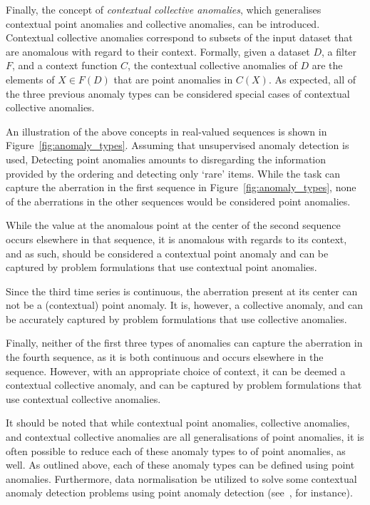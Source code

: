 Finally, the concept of \emph{contextual collective anomalies}, which generalises contextual point anomalies and collective anomalies, can be introduced. Contextual collective anomalies correspond to subsets of the input dataset that are anomalous with regard to their context. Formally, given a dataset $D$, a filter $F$, and a context function $C$, the contextual collective anomalies of $D$ are the elements of $X \in F(D)$ that are point anomalies in $C(X)$. As expected, all of the three previous anomaly types can be considered special cases of contextual collective anomalies.

An illustration of the above concepts in real-valued sequences is shown in Figure~\ref{fig:anomaly_types}. Assuming that unsupervised anomaly detection is used, Detecting point anomalies amounts to disregarding the information provided by the ordering and detecting only `rare' items. While the task can capture the aberration in the first sequence in Figure~\ref{fig:anomaly_types}, none of the aberrations in the other sequences would be considered point anomalies.

While the value at the anomalous point at the center of the second sequence occurs elsewhere in that sequence, it is anomalous with regards to its context, and as such, should be considered a contextual point anomaly and can be captured by problem formulations that use contextual point anomalies.

Since the third time series is continuous, the aberration present at its center can not be a (contextual) point anomaly. It is, however, a collective anomaly, and can be accurately captured by problem formulations that use collective anomalies.

Finally, neither of the first three types of anomalies can capture the aberration in the fourth sequence, as it is both continuous and occurs elsewhere in the sequence. However, with an appropriate choice of context, it can be deemed a contextual collective anomaly, and can be captured by problem formulations that use contextual collective anomalies.

It should be noted that while contextual point anomalies, collective anomalies, and contextual collective anomalies are all generalisations of point anomalies, it is often possible to reduce each of these anomaly types to of point anomalies, as well. As outlined above, each of these anomaly types can be defined using point anomalies. Furthermore, data normalisation be utilized to solve some contextual anomaly detection problems using point anomaly detection (see~\cite{meckesheimer}, for instance).

